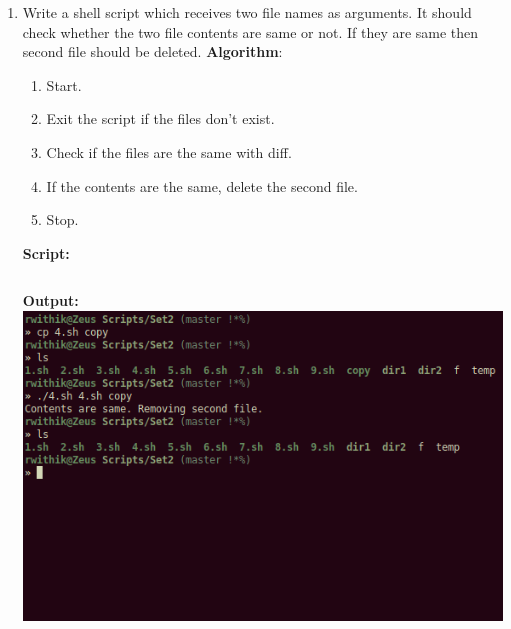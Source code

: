 \documentclass[10pt,a4paper,titlepage]{report}
\begin{document}
\begin{enumerate}
\item Write a shell script which receives two file names as arguments. It should check whether the two file contents are same or not. If they are same then second file should be deleted. \newline
\textbf{Algorithm}:\newline
\begin{enumerate}
	\item Start.
	\item Exit the script if the files don't exist.
	\item Check if the files are the same with {\color{red}diff}.
	\item If the contents are the same, delete the second file.
	\item Stop.
\end{enumerate}
\newline
\textbf{Script:}\newline
\inputminted{bash}{../Scripts/Set2/4.sh}
\newline
\textbf{Output:}\newline
\includegraphics[width=\linewidth]{../Images/Shell2/4.png}
\pagebreak


\end{enumerate}
\end{document}
